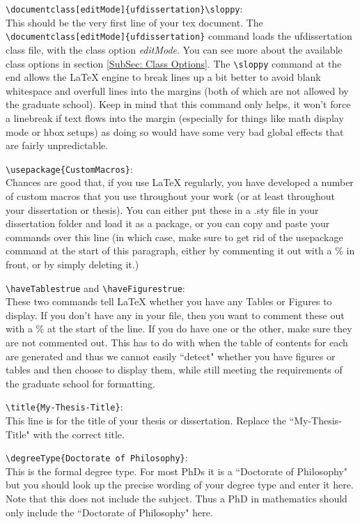 \documentclass{article}
\begin{document}
        \verb|\documentclass[editMode]{ufdissertation}\sloppy|:\\
        This should be the very first line of your tex document. The \verb|\documentclass[editMode]{ufdissertation}| command loads the ufdissertation class file, with the class option \textit{editMode}. You can see more about the available class options in section \ref{SubSec: Class Options}. The \verb|\sloppy| command at the end allows the LaTeX engine to break lines up a bit better to avoid blank whitespace and overfull lines into the margins (both of which are not allowed by the graduate school). Keep in mind that this command only helps, it won't force a linebreak if text flows into the margin (especially for things like math display mode or hbox setups) as doing so would have some very bad global effects that are fairly unpredictable.
        
        \verb|\usepackage{CustomMacros}|:\\ Chances are good that, if you use LaTeX regularly, you have developed a number of custom macros that you use throughout your work (or at least throughout your dissertation or thesis). You can either put these in a .sty file in your dissertation folder and load it as a package, or you can copy and paste your commands over this line (in which case, make sure to get rid of the usepackage command at the start of this paragraph, either by commenting it out with a $\%$ in front, or by simply deleting it.)
        
        \verb|\haveTablestrue| and \verb|\haveFigurestrue|: \\ These two commands tell LaTeX whether you have any Tables or Figures to display. If you don't have any in your file, then you want to comment these out with a $\%$ at the start of the line. If you do have one or the other, make sure they are not commented out. This has to do with when the table of contents for each are generated and thus we cannot easily ``detect" whether you have figures or tables and then choose to display them, while still meeting the requirements of the graduate school for formatting.
        
        \verb|\title{My-Thesis-Title}|: \\ This line is for the title of your thesis or dissertation. Replace the ``My-Thesis-Title" with the correct title.
        
        \verb|\degreeType{Doctorate of Philosophy}|: \\ This is the formal degree type. For most PhDs it is a ``Doctorate of Philosophy" but you should look up the precise wording of your degree type and enter it here. Note that this does not include the subject. Thus a PhD in mathematics should only include the ``Doctorate of Philosophy" here.
        
\end{document}

